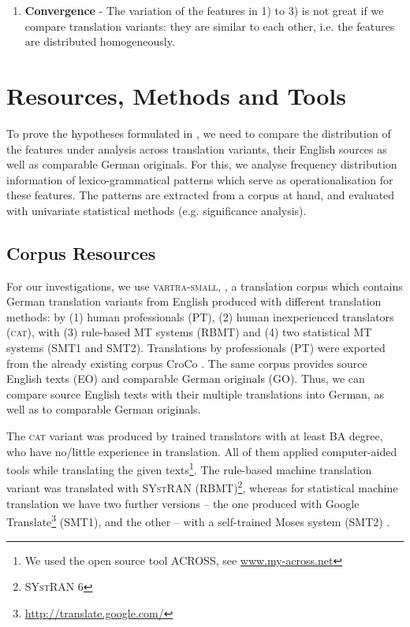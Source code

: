 \documentclass[output=paper]{LSP/langsci}
\begin{document}
\begin{enumerate}
\item \textbf{Convergence} - The variation of the features in 1) to 3) is not great if we compare translation variants: they are similar to each other, i.e. the features are distributed homogeneously.
\end{enumerate}

\section{Resources, Methods and Tools} \label{sec:4:3}

To prove the hypotheses formulated in , we need to compare the distribution of the features under analysis across translation variants, their English sources as well as comparable German originals. For this, we analyse frequency distribution information of lexico-grammatical patterns which serve as operationalisation for these features. The patterns are extracted from a corpus at hand, and evaluated with univariate statistical methods (e.g. significance analysis).

\subsection{Corpus Resources} \label{sec:4:3:1}
For our investigations, we use \textsc{vartra}-\textsc{small}, \citep[see][]{Lapshinova2013}, a translation corpus which contains German translation variants from English produced with different translation methods: by (1) human professionals (PT), (2) human inexperienced translators (\textsc{cat}), with (3) rule-based MT systems (RBMT) and (4) two statistical MT systems (SMT1 and SMT2). Translations by professionals (PT) were exported from the already existing corpus CroCo \citep{HansenSchirra2013}. The same corpus provides source English texts (EO) and comparable German originals (GO). Thus, we can compare source English texts with their multiple translations into German, as well as to comparable German originals.

The \textsc{cat} variant was produced by trained translators with at least BA degree, who have no/little experience in translation. All of them applied computer-aided tools while translating the given texts\footnote{We used the open source tool ACROSS, see \url{www.my-across.net}}. The rule-based machine translation variant was translated with SY\textsc{st}RAN (RBMT)\footnote{SY\textsc{st}RAN 6}, whereas for statistical machine translation we have two further versions – the one produced with Google Translate\footnote{\url{http://translate.google.com/}} (SMT1), and the other – with a self-trained Moses system (SMT2) \citep[see][]{Hoang2007}.
\end{document}
